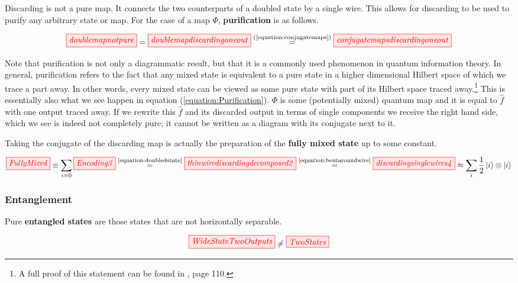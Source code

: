 \documentclass[]{article}
\newcommand{\equaltext}[1]{\ensuremath{\stackrel{\text{#1}}{=}}}
\begin{document}
Discarding is not a pure map. It connects the two counterparts of a doubled state by a single wire. This allows for discarding to be used to purify any arbitrary state or map. For the case of a map $\Phi$, \textbf{purification} is as follows.

\begin{equation}
\label{equation:Purification}
\tikzfig{doublemapnotpure} = \tikzfig{doublemapdiscardingoneout} \equaltext{(\ref{equation:conjugatemaps})} \tikzfig{conjugatemapsdiscardingoneout}
\end{equation}

Note that purification is not only a diagrammatic result, but that it is a commonly used phenomenon in quantum information theory. In general, purification refers to the fact that any mixed state is equivalent to a pure state in a higher dimensional Hilbert space of which we trace a part away. In other words, every mixed state can be viewed as some pure state with part of its Hilbert space traced away.\footnote{ A full proof of this statement can be found in \cite{Nielsen2011}, page 110.} This is essentially also what we see happen in equation (\ref{equation:Purification}). $\Phi$ is some (potentially mixed) quantum map and it is equal to $\hat{f}$ with one output traced away. If we rewrite this $\hat{f}$ and its discarded output in terms of single components we receive the right hand side, which we see is indeed not completely pure; it cannot be written as a diagram with its conjugate next to it.

Taking the conjugate of the discarding map is actually the preparation of the \textbf{fully mixed state} up to some constant.

\begin{equation}
	\label{equation:FullyMixed}
	\tikzfig{FullyMixed} \equiv \sum\limits_{i=0} \tikzfig{Encoding3} \equaltext{\ref{equation:doubledstate}} \tikzfig{thinwirediscardingdecomposed2}  \equaltext{\ref{equation:bentaroundwire}} \tikzfig{discardingsinglewires4} \approx \sum\limits_{i} \frac{1}{2} \ket{i} \otimes \ket{i}
\end{equation}

\subsubsection{Entanglement}
\label{entanglement}
Pure \textbf{entangled states} are those states that are not horizontally separable.

\begin{equation}
\tikzfig{WideStateTwoOutputs} \neq \tikzfig{TwoStates}
\end{equation}
\end{document}
